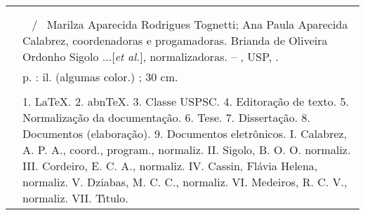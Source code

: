 %
\begin{fichacatalografica}
   \vspace*{\fill}					%
\begin{center}					%
  \imprimirnotabib \\
  \begin{table}[htb]
	\scriptsize
	\centering	
	\begin{tabular}{|p{0.9cm} p{8.7cm}|}
		\hline
	      & \\
		  &	  \imprimirautorficha     \\
		
		 \imprimircutter & 
							\hspace{0.4cm}\imprimirtitulo~ / ~{Marilza Aparecida Rodrigues Tognetti; Ana Paula Aparecida Calabrez,  coordenadoras e progamadoras. Brianda de Oliveira Ordonho Sigolo ...[\textit{et al.}], normalizadoras}.
							 -- 	\imprimirlocal, USP, \imprimirdata.   \\
		
		  &			\hspace{0.4cm}\pageref{LastPage} p. : il. (algumas color.) ; 30 cm.\\ 
 		  & \\ 
		  & \hspace{0.4cm}1. LaTeX. 2. abnTeX. 3. Classe USPSC. 4. Editora\c{c}\~ao de texto. 5. Normaliza\c{c}\~ao da documenta\c{c}\~ao. 6. Tese. 7. Disserta\c{c}\~ao. 8. Documentos (elabora\c{c}\~ao). 9. Documentos eletr\^onicos. I. Calabrez, A. P. A., coord., program., normaliz. II. Sigolo, B. O. O. normaliz. III. Cordeiro, E. C. A., normaliz. IV. Cassin, Fl\'avia Helena, normaliz. V. Dziabas, M. C. C., normaliz. VI. Medeiros, R. C. V., normaliz.  VII. T\'{\i}tulo.  \\
	
		  \hline
	\end{tabular}
  \end{table}
\end{center}
\end{fichacatalografica}
